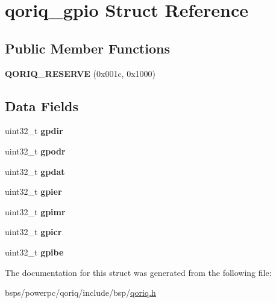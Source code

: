 \hypertarget{structqoriq__gpio}{}\section{qoriq\+\_\+gpio Struct Reference}
\label{structqoriq__gpio}
\subsection*{Public Member Functions}
\begin{DoxyCompactItemize}
\item 
\mbox{\label{structqoriq__gpio_a5664aec43ff7320d1c2615a9b9574dc7}} 
{\bfseries Q\+O\+R\+I\+Q\+\_\+\+R\+E\+S\+E\+R\+VE} (0x001c, 0x1000)
\end{DoxyCompactItemize}
\subsection*{Data Fields}
\begin{DoxyCompactItemize}
\item 
\mbox{\label{structqoriq__gpio_a5239cd2bc7ae734ce8c794f53e12a003}} 
uint32\+\_\+t {\bfseries gpdir}
\item 
\mbox{\label{structqoriq__gpio_a14cbcea101c90102137fb010c36a4fd7}} 
uint32\+\_\+t {\bfseries gpodr}
\item 
\mbox{\label{structqoriq__gpio_aea75c7640517192dca954acb2ddd644c}} 
uint32\+\_\+t {\bfseries gpdat}
\item 
\mbox{\label{structqoriq__gpio_a232b0daaa91a4139bc418e5a795b4455}} 
uint32\+\_\+t {\bfseries gpier}
\item 
\mbox{\label{structqoriq__gpio_abd9b739c99294d4f0ed5af769bfbb6f4}} 
uint32\+\_\+t {\bfseries gpimr}
\item 
\mbox{\label{structqoriq__gpio_a1e2c178b4044f2a257e0ee1ddddb72ea}} 
uint32\+\_\+t {\bfseries gpicr}
\item 
\mbox{\label{structqoriq__gpio_a639b063307213102575c031aa47eba70}} 
uint32\+\_\+t {\bfseries gpibe}
\end{DoxyCompactItemize}


The documentation for this struct was generated from the following file\+:\begin{DoxyCompactItemize}
\item 
bsps/powerpc/qoriq/include/bsp/\mbox{\hyperlink{qoriq_8h}{qoriq.\+h}}\end{DoxyCompactItemize}
